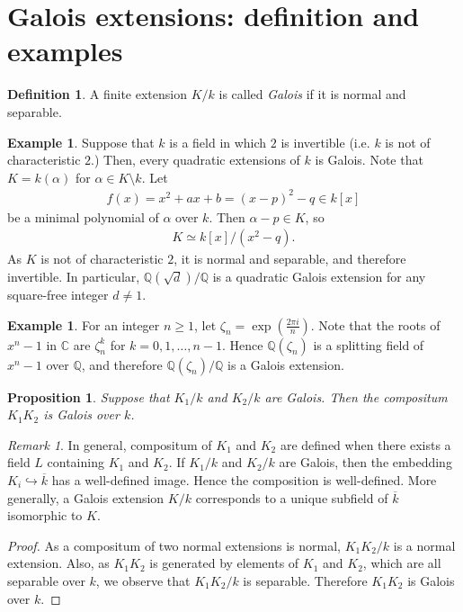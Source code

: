 \documentclass[12pt]{report}
\theoremstyle{plain}
\newtheorem{proposition}[theorem]{Proposition}
\theoremstyle{remark}
\newtheorem*{remark}{Remark}
\theoremstyle{definition}
\newtheorem{definition}[theorem]{Definition}
\newtheorem{example}[theorem]{Example}
\newcommand{\Q}{\mathbb{Q}}
\newcommand{\C}{\mathbb{C}}
\begin{document}
\clearpage
\section{Galois extensions: definition and examples}
\begin{definition}
    A finite extension $K/k$ is called \emph{Galois} if it is normal and separable.
\end{definition}

\begin{example}
    Suppose that $k$ is a field in which $2$ is invertible (i.e. $k$ is not of characteristic $2$.) Then, every quadratic extensions of $k$ is Galois. Note that $K=k(\alpha)$ for $\alpha\in K\setminus k$. Let
    \begin{align*}
        f(x) = x^2+ax+b=(x-p)^2-q\in k[x]
    \end{align*}
    be a minimal polynomial of $\alpha$ over $k$. Then $\alpha-p\in K$, so
    \begin{align*}
        K\simeq k[x]/(x^2-q).
    \end{align*}
    As $K$ is not of characteristic $2$, it is normal and separable, and therefore invertible. In particular, $\Q(\sqrt{d})/\Q$ is a quadratic Galois extension for any square-free integer $d\neq 1$.
\end{example}

\begin{example}
    For an integer $n\ge 1$, let $\zeta_n=\exp \left( \frac{2\pi i}{n} \right)$. Note that the roots of $x^n-1$ in $\C$ are $\zeta_n^k$ for $k=0,1,\dots,n-1$. Hence $\Q(\zeta_n)$ is a splitting field of $x^n-1$ over $\Q$, and therefore $\Q(\zeta_n)/\Q$ is a Galois extension.
\end{example}

\begin{proposition}
    Suppose that $K_1/k$ and $K_2/k$ are Galois. Then the compositum $K_1K_2$ is Galois over $k$.
\end{proposition}
\begin{remark}
    In general, compositum of $K_1$ and $K_2$ are defined when there exists a field $L$ containing $K_1$ and $K_2$. If $K_1/k$ and $K_2/k$ are Galois, then the embedding $K_i\hookrightarrow\overline{k}$ has a well-defined image. Hence the composition is well-defined. More generally, a Galois extension $K/k$ corresponds to a unique subfield of $\overline{k}$ isomorphic to $K$.
\end{remark}
\begin{proof}
    As a compositum of two normal extensions is normal, $K_1K_2/k$ is a normal extension. Also, as $K_1K_2$ is generated by elements of $K_1$ and $K_2$, which are all separable over $k$, we observe that $K_1K_2/k$ is separable. Therefore $K_1K_2$ is Galois over $k$.
\end{proof}
\end{document}
